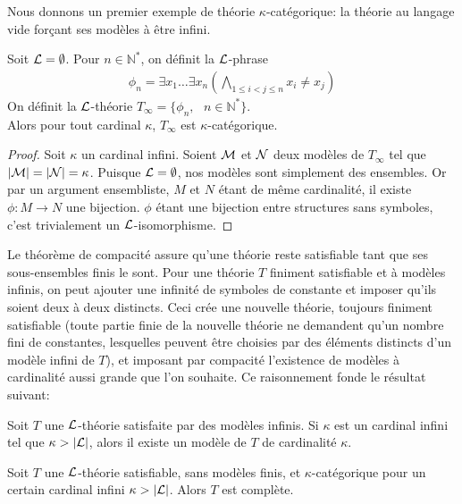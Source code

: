 \noindent Nous donnons un premier exemple de théorie $\kappa$-catégorique: la théorie au langage vide forçant ses modèles à être infini.

\begin{prop}
Soit $\mathcal{L} = \emptyset$. Pour $n \in \mathbb{N^*}$, on définit la $\mathcal{L}$-phrase
\begin{align*}
\phi_n = \exists x_1\dots\exists x_n(\bigwedge_{1\leq i < j \leq n} x_i \neq x_j)
\end{align*}
On définit la $\mathcal{L}$-théorie $T_{\infty} = \{\phi_n,\text{ }n \in \mathbb{N^*}\}$.\\
Alors pour tout cardinal $\kappa$, $T_{\infty}$ est $\kappa$-catégorique.
\end{prop}

\begin{proof}
Soit $\kappa$ un cardinal infini. Soient $\mathcal{M}$ et $\mathcal{N}$ deux modèles de $T_{\infty}$ tel que $\lvert \mathcal{M} \rvert = \lvert \mathcal{N} \rvert = \kappa$.
Puisque $\mathcal{L} = \emptyset$, nos modèles sont simplement des ensembles. Or par un argument ensembliste, $M$ et $N$ étant de même cardinalité, il existe $\phi: M \longrightarrow N$ une bijection.
$\phi$ étant une bijection entre structures sans symboles, c'est trivialement un $\mathcal{L}$-isomorphisme.
\end{proof}

\noindent Le théorème de compacité assure qu'une théorie reste satisfiable tant que ses sous-ensembles finis le sont.
Pour une théorie $T$ finiment satisfiable et à modèles infinis, on peut ajouter une infinité de symboles de constante et imposer qu'ils soient deux à deux distincts.
Ceci crée une nouvelle théorie, toujours finiment satisfiable (toute partie finie de la nouvelle théorie ne demandent qu'un nombre fini de constantes, lesquelles peuvent 
être choisies par des éléments distincts d'un modèle infini de $T$), et imposant par compacité l'existence de modèles à cardinalité aussi grande que l'on souhaite.
Ce raisonnement fonde le résultat suivant:


\begin{theo}
Soit $T$ une $\mathcal{L}$-théorie satisfaite par des modèles infinis. Si $\kappa$ est un cardinal infini tel que $\kappa > \lvert \mathcal{L} \rvert$, alors
il existe un modèle de $T$ de cardinalité $\kappa$.
\end{theo}

\begin{theo}\label{th-Vaught}
Soit $T$ une $\mathcal{L}$-théorie satisfiable, sans modèles finis, et $\kappa$-catégorique pour un certain cardinal infini $\kappa > \lvert \mathcal{L} \rvert$.
Alors $T$ est complète.
\end{theo}

